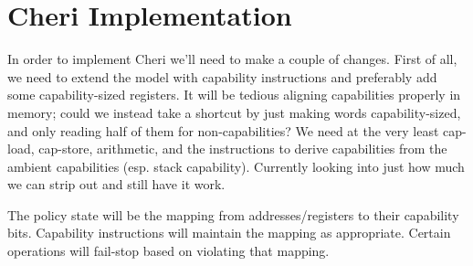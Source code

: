 \documentclass{article}
\begin{document}
\section{Cheri Implementation}

In order to implement Cheri we'll need to make a couple of changes. First of all, we need to extend the model
with capability instructions and preferably add some capability-sized registers. It will be tedious aligning
capabilities properly in memory; could we instead take a shortcut by just making words capability-sized, and
only reading half of them for non-capabilities? We need at the very least cap-load, cap-store, arithmetic,
and the instructions to derive capabilities from the ambient capabilities (esp. stack capability). Currently
looking into just how much we can strip out and still have it work.

The policy state will be the mapping from addresses/registers to their capability bits. Capability instructions
will maintain the mapping as appropriate. Certain operations will fail-stop based on violating that mapping.
\end{document}

